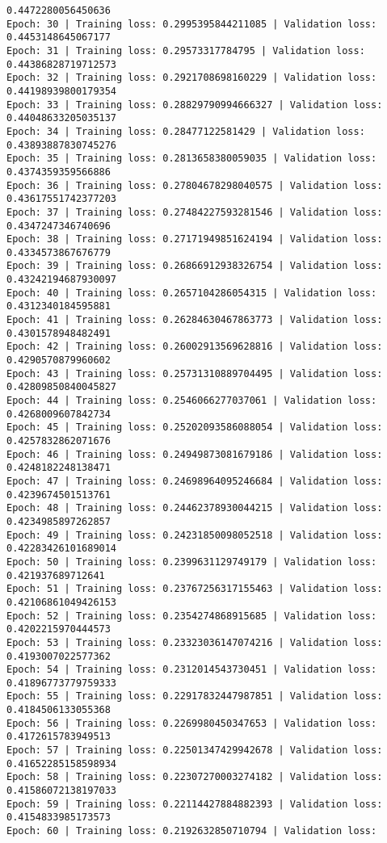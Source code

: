 \documentclass[11pt]{article}
\begin{document}
\begin{Verbatim}[commandchars=\\\{\}]
0.4472280056450636
Epoch: 30 | Training loss: 0.2995395844211085 | Validation loss:
0.4453148645067177
Epoch: 31 | Training loss: 0.29573317784795 | Validation loss:
0.44386828719712573
Epoch: 32 | Training loss: 0.2921708698160229 | Validation loss:
0.44198939800179354
Epoch: 33 | Training loss: 0.28829790994666327 | Validation loss:
0.44048633205035137
Epoch: 34 | Training loss: 0.28477122581429 | Validation loss:
0.43893887830745276
Epoch: 35 | Training loss: 0.2813658380059035 | Validation loss:
0.4374359359566886
Epoch: 36 | Training loss: 0.27804678298040575 | Validation loss:
0.43617551742377203
Epoch: 37 | Training loss: 0.27484227593281546 | Validation loss:
0.4347247346740696
Epoch: 38 | Training loss: 0.27171949851624194 | Validation loss:
0.4334573867676779
Epoch: 39 | Training loss: 0.26866912938326754 | Validation loss:
0.43242194687930097
Epoch: 40 | Training loss: 0.2657104286054315 | Validation loss:
0.4312340184595881
Epoch: 41 | Training loss: 0.26284630467863773 | Validation loss:
0.4301578948482491
Epoch: 42 | Training loss: 0.26002913569628816 | Validation loss:
0.4290570879960602
Epoch: 43 | Training loss: 0.25731310889704495 | Validation loss:
0.42809850840045827
Epoch: 44 | Training loss: 0.2546066277037061 | Validation loss:
0.4268009607842734
Epoch: 45 | Training loss: 0.25202093586088054 | Validation loss:
0.4257832862071676
Epoch: 46 | Training loss: 0.24949873081679186 | Validation loss:
0.4248182248138471
Epoch: 47 | Training loss: 0.24698964095246684 | Validation loss:
0.4239674501513761
Epoch: 48 | Training loss: 0.24462378930044215 | Validation loss:
0.4234985897262857
Epoch: 49 | Training loss: 0.24231850098052518 | Validation loss:
0.42283426101689014
Epoch: 50 | Training loss: 0.2399631129749179 | Validation loss:
0.421937689712641
Epoch: 51 | Training loss: 0.23767256317155463 | Validation loss:
0.42106861049426153
Epoch: 52 | Training loss: 0.2354274868915685 | Validation loss:
0.4202215970444573
Epoch: 53 | Training loss: 0.23323036147074216 | Validation loss:
0.4193007022577362
Epoch: 54 | Training loss: 0.2312014543730451 | Validation loss:
0.41896773779759333
Epoch: 55 | Training loss: 0.22917832447987851 | Validation loss:
0.4184506133055368
Epoch: 56 | Training loss: 0.2269980450347653 | Validation loss:
0.4172615783949513
Epoch: 57 | Training loss: 0.22501347429942678 | Validation loss:
0.41652285158598934
Epoch: 58 | Training loss: 0.22307270003274182 | Validation loss:
0.41586072138197033
Epoch: 59 | Training loss: 0.22114427884882393 | Validation loss:
0.4154833985173573
Epoch: 60 | Training loss: 0.2192632850710794 | Validation loss:

\end{Verbatim}
\end{document}
